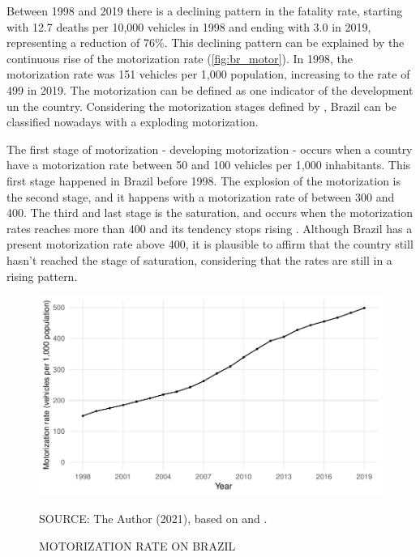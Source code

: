 Between 1998 and 2019 there is a declining pattern in the fatality rate, starting with 12.7 deaths per 10,000 vehicles in 1998 and ending with 3.0 in 2019, representing a reduction of 76\%. This declining pattern can be explained by the continuous rise of the motorization rate (\autoref{fig:br_motor}). In 1998, the motorization rate was 151 vehicles per 1,000 population, increasing to the rate of 499 in 2019. The motorization can be defined as one indicator of the development un the country. Considering the motorization stages defined by \textcite{Jorgensen2005}, Brazil can be classified nowadays with a exploding motorization. 

The first stage of motorization - developing motorization - occurs when a country have a motorization rate between 50 and 100 vehicles per 1,000 inhabitants. This first stage happened in Brazil before 1998. The explosion of the motorization is the second stage, and it happens with a motorization rate of between 300 and 400. The third and last stage is the saturation, and occurs when the motorization rates reaches more than 400 and its tendency stops rising \cite{Jorgensen2005}. Although Brazil has a present motorization rate above 400, it is plausible to affirm that the country still hasn't reached the stage of saturation, considering that the rates are still in a rising pattern. 

\begin{figure}[!htbp]
    \centering\footnotesize
    \captionsetup{font=footnotesize}
    \caption{MOTORIZATION RATE ON BRAZIL}
    \includegraphics{fig/brazil_motor.pdf}
    \label{fig:br_motor}
    \par SOURCE: The Author (2021), based on \textcite{MinistryofHealth2021} and \textcite{DENATRAN2020}.
\end{figure} 

